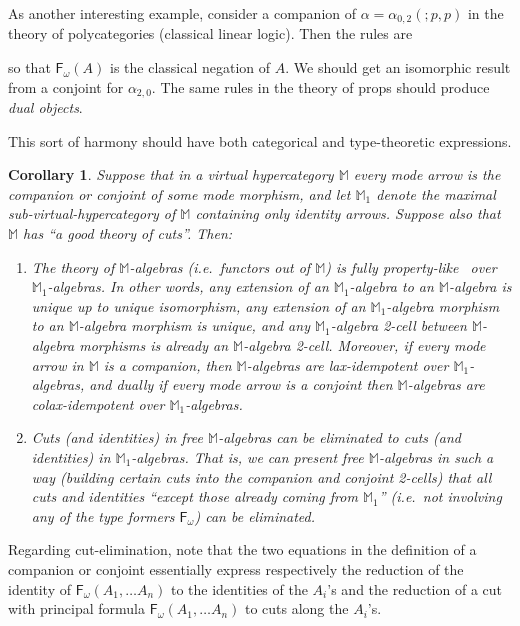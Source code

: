 \documentclass{article}
\newtheorem{conj}[thm]{Corollary}
\theoremstyle{definition}
\theoremstyle{remark}
\def\M{\mathbb{M}}
\def\form#1{\mathsf{F}_{#1}}
\let\types\vdash
\begin{document}
As another interesting example, consider a companion of $\alpha = \alpha_{0,2}(;p,p)$ in the theory of polycategories (classical linear logic).
Then the rules are
so that $\form\omega(A)$ is the classical negation of $A$.
We should get an isomorphic result from a conjoint for $\alpha_{2,0}$.
The same rules in the theory of props should produce \emph{dual objects}.

This sort of harmony should have both categorical and type-theoretic expressions.

\begin{conj}
  Suppose that in a virtual hypercategory $\M$ every mode arrow is the companion or conjoint of some mode morphism, and let $\M_1$ denote the maximal sub-virtual-hypercategory of $\M$ containing only identity arrows.
  Suppose also that $\M$ has ``a good theory of cuts''.
  Then:
  \begin{enumerate}
  \item The theory of $\M$-algebras (i.e.\ functors out of $\M$) is fully property-like~\cite{kl:property-like} over $\M_1$-algebras.
    In other words, any extension of an $\M_1$-algebra to an $\M$-algebra is unique up to unique isomorphism, any extension of an $\M_1$-algebra morphism to an $\M$-algebra morphism is unique, and any $\M_1$-algebra 2-cell between $\M$-algebra morphisms is already an $\M$-algebra 2-cell.
    Moreover, if every mode arrow in $\M$ is a companion, then $\M$-algebras are lax-idempotent over $\M_1$-algebras, and dually if every mode arrow is a conjoint then $\M$-algebras are colax-idempotent over $\M_1$-algebras.
  \item Cuts (and identities) in free $\M$-algebras can be eliminated to cuts (and identities) in $\M_1$-algebras.
    That is, we can present free $\M$-algebras in such a way (building certain cuts into the companion and conjoint 2-cells) that all cuts and identities ``except those already coming from $\M_1$'' (i.e.\ not involving any of the type formers $\form\omega$) can be eliminated.
  \end{enumerate}
\end{conj}

Regarding cut-elimination, note that the two equations in the definition of a companion or conjoint essentially express respectively the reduction of the identity of $\form\omega(A_1,\dots A_n)$ to the identities of the $A_i$'s and the reduction of a cut with principal formula $\form\omega(A_1,\dots A_n)$ to cuts along the $A_i$'s.
\end{document}
